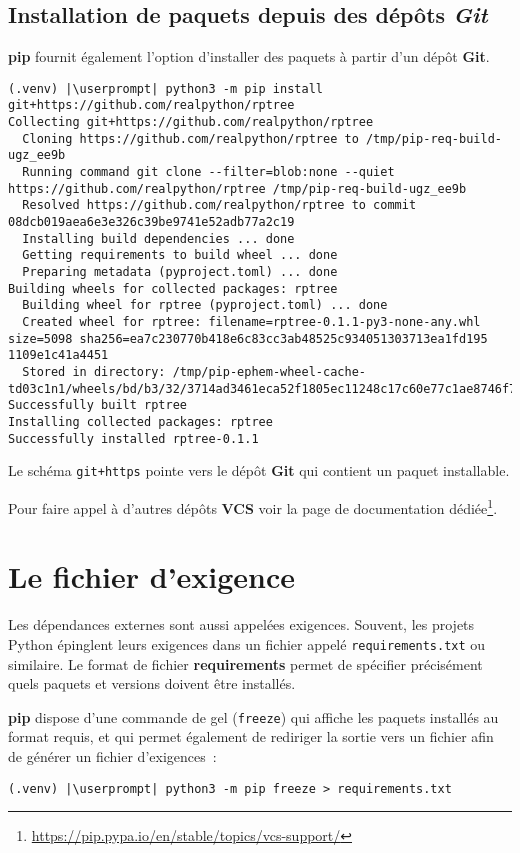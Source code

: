 \subsection*{Installation de paquets depuis des dépôts \textit{Git}}
\textbf{pip} fournit également l’option d’installer des paquets à partir d’un dépôt \textbf{Git}. 
\begin{lstlisting}[style=bash]
(.venv) |\userprompt| python3 -m pip install git+https://github.com/realpython/rptree
Collecting git+https://github.com/realpython/rptree
  Cloning https://github.com/realpython/rptree to /tmp/pip-req-build-ugz_ee9b
  Running command git clone --filter=blob:none --quiet https://github.com/realpython/rptree /tmp/pip-req-build-ugz_ee9b
  Resolved https://github.com/realpython/rptree to commit 08dcb019aea6e3e326c39be9741e52adb77a2c19
  Installing build dependencies ... done
  Getting requirements to build wheel ... done
  Preparing metadata (pyproject.toml) ... done
Building wheels for collected packages: rptree
  Building wheel for rptree (pyproject.toml) ... done
  Created wheel for rptree: filename=rptree-0.1.1-py3-none-any.whl size=5098 sha256=ea7c230770b418e6c83cc3ab48525c934051303713ea1fd195 1109e1c41a4451
  Stored in directory: /tmp/pip-ephem-wheel-cache-td03c1n1/wheels/bd/b3/32/3714ad3461eca52f1805ec11248c17c60e77c1ae8746f79179
Successfully built rptree
Installing collected packages: rptree
Successfully installed rptree-0.1.1
\end{lstlisting}

Le schéma \texttt{git+https} pointe vers le dépôt \textbf{Git} qui contient un paquet installable.

Pour faire appel à d'autres dépôts \textbf{VCS} voir la page de documentation dédiée\footnote{\url{https://pip.pypa.io/en/stable/topics/vcs-support/}}.

\section{Le fichier d'exigence}
Les dépendances externes sont aussi appelées exigences. Souvent, les projets Python épinglent leurs exigences dans un fichier appelé \texttt{requirements.txt} ou similaire. Le format de fichier \textbf{requirements} permet de spécifier précisément quels paquets et versions doivent être installés.

\textbf{pip} dispose d'une commande de gel (\texttt{freeze}) qui affiche les paquets installés au format requis, et qui permet également de rediriger la sortie vers un fichier afin de générer un fichier d’exigences :
\begin{lstlisting}[style=bash]
(.venv) |\userprompt| python3 -m pip freeze > requirements.txt
\end{lstlisting}

